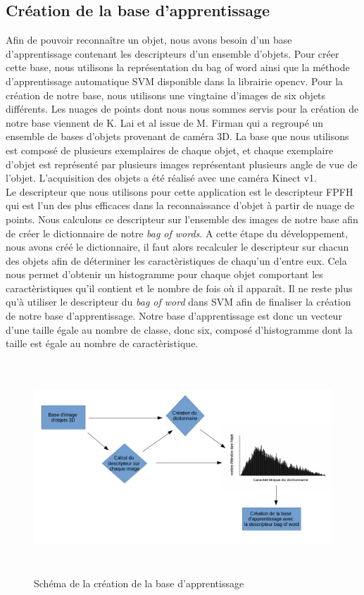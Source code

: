 \subsection{Création de la base d'apprentissage}
Afin de pouvoir reconnaître un objet, nous avons besoin d'un base d'apprentissage contenant les descripteurs d'un ensemble
d'objets. Pour créer cette base, nous utilisons la représentation du \og bag of word \fg ainsi que la méthode d'apprentissage 
automatique SVM\cite{SVM} disponible dans la librairie opencv. Pour la création de notre base, nous utilisons une vingtaine
d'images de six objets différents. Les nuages de points dont nous nous sommes servis pour la création de notre base viennent de 
K. Lai et al\cite{Base1} issue de M. Firman\cite{generalBase} qui a regroupé un ensemble de bases d'objets provenant de caméra 3D.
La base que nous utilisons est composé de plusieurs exemplaires de chaque objet, et chaque exemplaire d'objet est représenté par 
plusieurs images représentant plusieurs angle de vue de l'objet. L'acquisition des objets a été réalisé avec une caméra 
Kinect v1.\\

Le descripteur que nous utilisons pour cette application est le descripteur FPFH\cite{FPFH} qui est l'un des plus efficaces dans la
reconnaissance d'objet à partir de nuage de points. Nous calculons ce descripteur sur l'ensemble des images de notre base afin de
créer le dictionnaire de notre \textit{bag of words}. A cette étape du développement, nous avons créé le dictionnaire, il faut
alors recalculer le descripteur sur chacun des objets afin de déterminer les caractèristiques de chaqu'un d'entre eux. Cela nous
permet d'obtenir un histogramme pour chaque objet comportant les caractèristiques qu'il contient et le nombre de fois où il
apparaît. Il ne reste plus qu'à utiliser le descripteur du \textit{bag of word} dans SVM afin de finaliser la création de 
notre base d'apprentissage. Notre base d'apprentissage est donc un vecteur d'une taille égale au nombre de classe, donc six, 
composé d'histogramme dont la taille est égale au nombre de caractèristique.

\begin{figure}[!ht]
  \begin{center}
    \includegraphics[height=8cm]{image/schemaBase.png}
    \caption{Schéma de la création de la base d'apprentissage}
  \end{center}
\end{figure}

